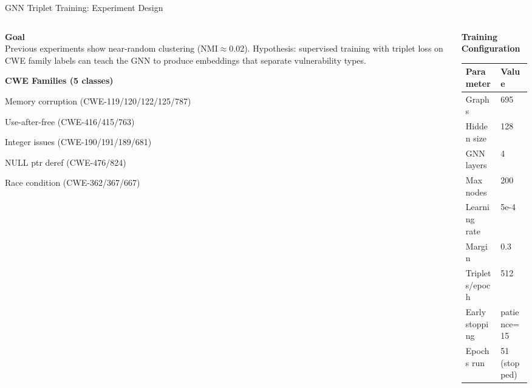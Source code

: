 \documentclass[aspectratio=169,10pt]{beamer}
\begin{document}
\begin{frame}{GNN Triplet Training: Experiment Design}
\begin{columns}[T]
\begin{column}{0.50\textwidth}

  \textbf{Goal}\\[3pt]
  {\small Previous experiments show near-random clustering (NMI$\approx$0.02).
  Hypothesis: supervised training with triplet loss on CWE family labels
  can teach the GNN to produce embeddings that separate vulnerability types.}

  \vspace{0.5em}
  \textbf{CWE Families (5 classes)}
  \begin{itemize}\itemsep1pt
    {\small
    \item Memory corruption (CWE-119/120/122/125/787)
    \item Use-after-free (CWE-416/415/763)
    \item Integer issues (CWE-190/191/189/681)
    \item NULL ptr deref (CWE-476/824)
    \item Race condition (CWE-362/367/667)
    }
  \end{itemize}

\end{column}
\begin{column}{0.47\textwidth}

  {\small\textbf{Training Configuration}}\\[4pt]
  {\scriptsize
  \renewcommand{\arraystretch}{1.25}
  \begin{tabular}{p{2.5cm}p{3.0cm}}
    \toprule
    \textbf{Parameter} & \textbf{Value} \\
    \midrule
    Graphs & 695 \\
    Hidden size & 128 \\
    GNN layers & 4 \\
    Max nodes & 200 \\
    Learning rate & 5e-4 \\
    Margin & 0.3 \\
    Triplets/epoch & 512 \\
    Early stopping & patience=15 \\
    Epochs run & 51 (stopped) \\
    \bottomrule
  \end{tabular}}

\end{column}
\end{columns}
\end{frame}
\end{document}
